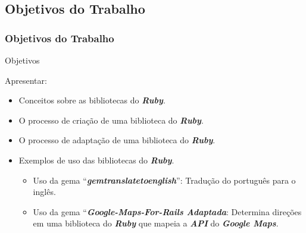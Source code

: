  \subsection{Objetivos do Trabalho}
 \begin{frame}
  \frametitle{Objetivos do Trabalho}

  \begin{block}{Objetivos}

   Apresentar:

   \begin{itemize}

    \item  Conceitos sobre as bibliotecas do \emph{\textbf{Ruby}}.

    \item  O processo de criação de uma biblioteca do \emph{\textbf{Ruby}}.

    \item  O processo de adaptação de uma biblioteca do \emph{\textbf{Ruby}}.

    \item  Exemplos de uso das bibliotecas do \emph{\textbf{Ruby}}.

    \begin{itemize}

     \item Uso da gema ``\emph{\textbf{gemtranslatetoenglish}}'': Tradução do português para o inglês.

     \item Uso da gema ``\emph{\textbf{Google-Maps-For-Rails Adaptada}}: Determina direções em uma
     biblioteca do \emph{\textbf{Ruby}} que mapeia a \emph{\textbf{API}} do
     \emph{\textbf{Google Maps}}.

    \end{itemize}

   \end{itemize}

  \end{block}

\end{frame}